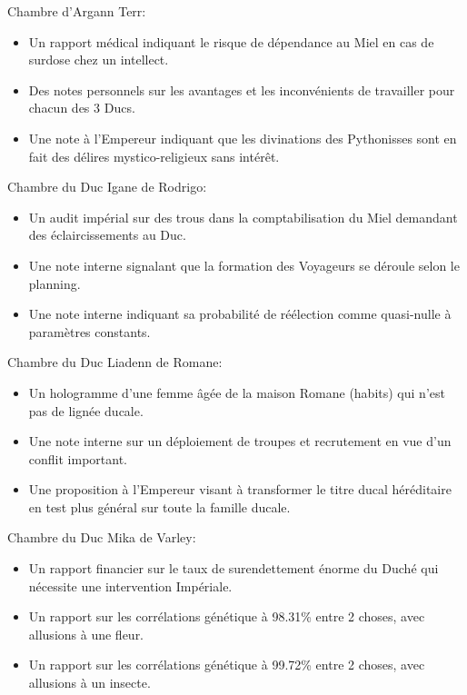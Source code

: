 \documentclass{article}
\begin{document}
Chambre d'Argann Terr:
\begin{itemize}
    \item Un rapport médical indiquant le risque de dépendance au Miel en cas
        de surdose chez un intellect.
    \item Des notes personnels sur les avantages et les inconvénients de
        travailler pour chacun des 3 Ducs.
    \item Une note à l'Empereur indiquant que les divinations des Pythonisses
        sont en fait des délires mystico-religieux sans intérêt.
\end{itemize}

Chambre du Duc Igane de Rodrigo:
\begin{itemize}
    \item Un audit impérial sur des trous dans la comptabilisation du Miel
        demandant des éclaircissements au Duc.
    \item Une note interne signalant que la formation des Voyageurs se déroule
        selon le planning.
    \item Une note interne indiquant sa probabilité de réélection comme
        quasi-nulle \og à paramètres constants\fg{}.
\end{itemize}

Chambre du Duc Liadenn de Romane:
\begin{itemize}
    \item Un hologramme d'une femme âgée de la maison Romane (habits) qui n'est
        pas de lignée ducale.
    \item Une note interne sur un déploiement de troupes et recrutement en vue 
        d'un conflit important.
    \item Une proposition à l'Empereur visant à transformer le titre ducal
        héréditaire en test plus général sur toute la famille ducale.
\end{itemize}

Chambre du Duc Mika de Varley:
\begin{itemize}
    \item Un rapport financier sur le taux de surendettement énorme du Duché
        qui nécessite une intervention Impériale.
    \item Un rapport sur les corrélations génétique à 98.31\% entre 2 choses,
        avec allusions à une fleur.
    \item Un rapport sur les corrélations génétique à 99.72\% entre 2 choses,
        avec allusions à un insecte.
\end{itemize}
\end{document}
